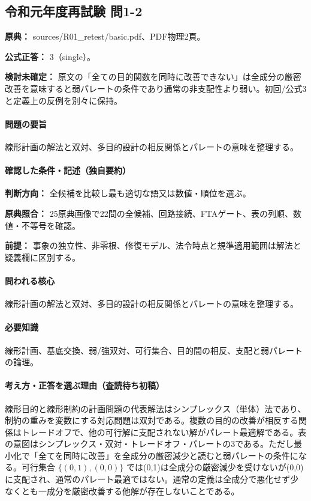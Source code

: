 \subsection{令和元年度再試験 問1-2}
\label{q:r01-ret-basic-1-2}

\noindent\textbf{原典：} sources/R01\_retest/basic.pdf、PDF物理2頁。

\textbf{公式正答：} 3（single）。

\par\textbf{検討未確定：} 原文の「全ての目的関数を同時に改善できない」は全成分の厳密改善を意味すると弱パレートの条件であり通常の非支配性より弱い。初回/公式3と定義上の反例を別々に保持。

\paragraph{問題の要旨} 線形計画の解法と双対、多目的設計の相反関係とパレートの意味を整理する。

\paragraph{確認した条件・記述（独自要約）}\mbox{}\par

\noindent\textbf{判断方向：} 全候補を比較し最も適切な語又は数値・順位を選ぶ。\par

\noindent\textbf{原典照合：} 25原典画像で22問の全候補、回路接続、FTAゲート、表の列順、数値・不等号を確認。\par

\noindent\textbf{前提：} 事象の独立性、非零根、修復モデル、法令時点と規準適用範囲は解法と疑義欄に区別する。\par

\paragraph{問われる核心} 線形計画の解法と双対、多目的設計の相反関係とパレートの意味を整理する。

\paragraph{必要知識} 線形計画、基底交換、弱/強双対、可行集合、目的間の相反、支配と弱パレートの論理。

\paragraph{考え方・正答を選ぶ理由（査読待ち初稿）} 線形目的と線形制約の計画問題の代表解法はシンプレックス（単体）法であり、制約の重みを変数にする対応問題は双対である。複数の目的の改善が相反する関係はトレードオフで、他の可行解に支配されない解がパレート最適解である。表の意図はシンプレックス・双対・トレードオフ・パレートの3である。ただし最小化で「全てを同時に改善」を全成分の厳密減少と読むと弱パレートの条件になる。可行集合 \(\{(0,1),(0,0)\}\) では(0,1)は全成分の厳密減少を受けないが(0,0)に支配され、通常のパレート最適ではない。通常の定義は全成分で悪化せず少なくとも一成分を厳密改善する他解が存在しないことである。

